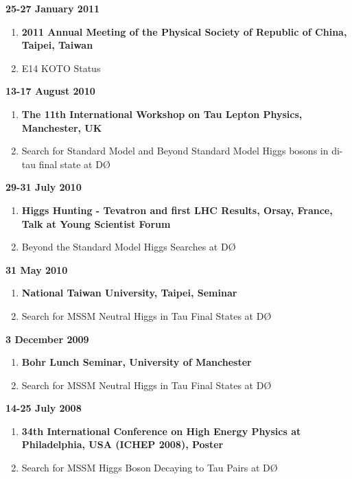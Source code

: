 \documentclass[12pt]{article}
\newenvironment{outerlist}[1][\enskip\textbullet]%
        {\begin{enumerate}[#1]}{\end{enumerate}%
         \vspace{-.6\baselineskip}}
\begin{document}
\textbf{25-27 January 2011}
\begin{outerlist}
\item[] \textbf{2011 Annual Meeting of the Physical Society of Republic of China, Taipei, Taiwan}\vspace{-2mm}
\item[] E14 KOTO Status
\end{outerlist}
\vspace{2mm}
\textbf{13-17 August 2010}
\begin{outerlist}
\item[] \textbf{The 11th International Workshop on Tau Lepton Physics, Manchester, UK}\vspace{-2mm}
\item[] Search for Standard Model and Beyond Standard Model Higgs bosons in di-tau final state at D\O
\end{outerlist}
\vspace{2mm}
\textbf{29-31 July 2010}
\begin{outerlist}
\item[] \textbf{Higgs Hunting - Tevatron and first LHC Results, Orsay, France, Talk at Young Scientist Forum}\vspace{-2mm}
\item[] Beyond the Standard Model Higgs Searches at D\O
\end{outerlist}
\vspace{2mm}
\textbf{31 May 2010}
\begin{outerlist}
\item[] \textbf{National Taiwan University, Taipei, Seminar}\vspace{-2mm}
\item[] Search for MSSM Neutral Higgs in Tau Final States at D\O
\end{outerlist}
\vspace{2mm}
\textbf{3 December 2009}
\begin{outerlist}
\item[] \textbf{Bohr Lunch Seminar, University of Manchester}\vspace{-2mm}
\item[] Search for MSSM Neutral Higgs in Tau Final States at D\O
\end{outerlist}
\vspace{2mm}
\textbf{14-25 July 2008}
\begin{outerlist}
\item[] \textbf{34th International Conference on High Energy Physics at Philadelphia, USA (ICHEP 2008), Poster}\vspace{-2mm}
\item[] Search for MSSM Higgs Boson Decaying to Tau Pairs at D\O
\end{outerlist}
\end{document}
